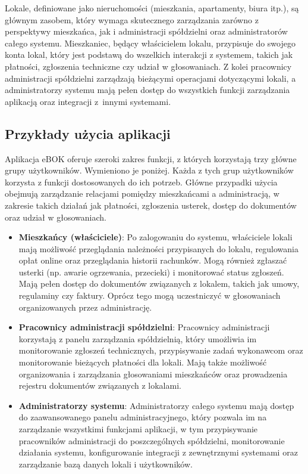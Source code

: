 Lokale, definiowane jako nieruchomości (mieszkania, apartamenty, biura itp.), są głównym zasobem, który wymaga skutecznego zarządzania zarówno z perspektywy mieszkańca, jak i administracji spółdzielni oraz administratorów całego systemu. Mieszkaniec, będący właścicielem lokalu, przypisuje do swojego konta lokal, który jest podstawą do wszelkich interakcji z systemem, takich jak płatności, zgłoszenia techniczne czy udział w głosowaniach. Z kolei pracownicy administracji spółdzielni zarządzają bieżącymi operacjami dotyczącymi lokali, a administratorzy systemu mają pełen dostęp do wszystkich funkcji zarządzania aplikacją oraz integracji z~innymi systemami.

\subsection{Przykłady użycia aplikacji}

Aplikacja eBOK oferuje szeroki zakres funkcji, z których korzystają trzy główne grupy użytkowników. Wymieniono je poniżej. Każda z tych grup użytkowników korzysta z funkcji dostosowanych do ich potrzeb. Główne przypadki użycia obejmują zarządzanie relacjami pomiędzy mieszkańcami a administracją, w zakresie takich działań jak płatności, zgłoszenia usterek, dostęp do dokumentów oraz udział w głosowaniach. 
\begin{itemize} 

	\item \textbf{Mieszkańcy (właściciele)}: Po zalogowaniu do systemu, właściciele lokali mają możliwość przeglądania należności przypisanych do lokalu, regulowania opłat online oraz przeglądania historii rachunków. Mogą również zgłaszać usterki (np. awarie ogrzewania, przecieki) i monitorować status zgłoszeń. Mają pełen dostęp do dokumentów związanych z lokalem, takich jak umowy, regulaminy czy faktury. Oprócz tego mogą uczestniczyć w głosowaniach organizowanych przez administrację.
	
	\item \textbf{Pracownicy administracji spółdzielni}: Pracownicy administracji korzystają z panelu zarządzania spółdzielnią, który umożliwia im monitorowanie zgłoszeń technicznych, przypisywanie zadań wykonawcom oraz monitorowanie bieżących płatności dla lokali. Mają także możliwość organizowania i zarządzania głosowaniami mieszkańców oraz prowadzenia rejestru dokumentów związanych z lokalami.

	\item \textbf{Administratorzy systemu}: Administratorzy całego systemu mają dostęp do zaawansowanego panelu administracyjnego, który pozwala im na zarządzanie wszystkimi funkcjami aplikacji, w tym przypisywanie pracowników administracji do poszczególnych spółdzielni, monitorowanie działania systemu, konfigurowanie integracji z zewnętrznymi systemami oraz zarządzanie bazą danych lokali i użytkowników.

\end{itemize}



